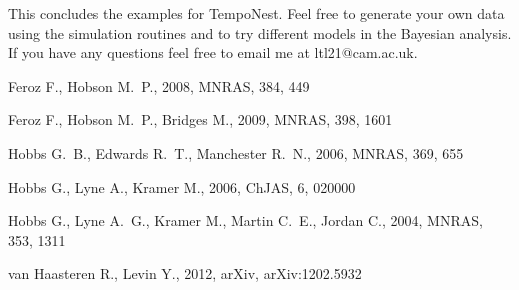 \documentclass[%
 preprint,
 amsmath,amssymb,amsfonts,
 aps,
]{revtex4-1}
\begin{document}
This concludes the examples for TempoNest.  Feel free to generate your own data using the simulation routines and to try different models in the Bayesian analysis.  If you have any questions feel free to email me at ltl21@cam.ac.uk.



\begin{thebibliography}{}
\setlength{\labelwidth}{0pt} %

 Feroz F., Hobson M.~P., 2008, MNRAS, 384, 449 


 Feroz F., Hobson M.~P., Bridges M., 2009, MNRAS, 398, 1601 

 Hobbs G.~B., Edwards R.~T., Manchester R.~N., 2006, MNRAS, 369, 655 

 Hobbs G., Lyne A., Kramer M., 2006, ChJAS, 6, 020000 


Hobbs G., Lyne A.~G., Kramer M., Martin C.~E., Jordan C., 2004, MNRAS, 353, 
1311 

 van Haasteren R., Levin Y., 2012, arXiv, arXiv:1202.5932

\end{thebibliography}
\end{document}
